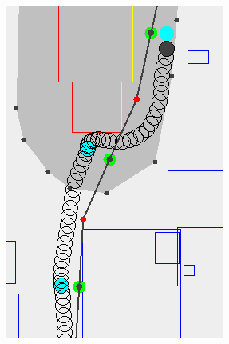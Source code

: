 \begin{figure}
\begin{subfigure}[t]{0.30\columnwidth}
        		\includegraphics[width=\textwidth]{img/transition-suboptimal-post}
        		\caption{}
        		 \label{fig:transition-suboptimal-post}
	\end{subfigure}	
		\hfill
	\begin{subfigure}[t]{0.30\columnwidth}

\end{subfigure}
\end{figure}
